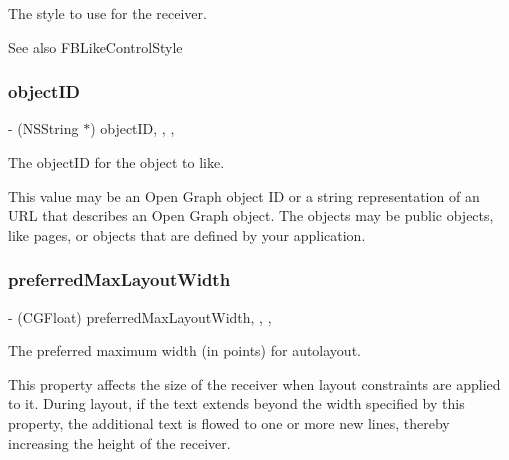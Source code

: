 The style to use for the receiver.

\begin{DoxySeeAlso}{See also}
F\+B\+Like\+Control\+Style 
\end{DoxySeeAlso}
\mbox{\label{interfaceFBLikeControl_ad46d4cb5a5d5985e89a09193a8499ffd}} 
\subsubsection{\texorpdfstring{object\+ID}{objectID}}
{\footnotesize\ttfamily -\/ (N\+S\+String $\ast$) object\+ID\hspace{0.3cm}{\ttfamily [read]}, {\ttfamily [write]}, {\ttfamily [nonatomic]}, {\ttfamily [copy]}}

The object\+ID for the object to like.

This value may be an Open Graph object ID or a string representation of an U\+RL that describes an Open Graph object. The objects may be public objects, like pages, or objects that are defined by your application. \mbox{\label{interfaceFBLikeControl_a34871f0ad32d03df9f3659962a01c8c1}} 
\subsubsection{\texorpdfstring{preferred\+Max\+Layout\+Width}{preferredMaxLayoutWidth}}
{\footnotesize\ttfamily -\/ (C\+G\+Float) preferred\+Max\+Layout\+Width\hspace{0.3cm}{\ttfamily [read]}, {\ttfamily [write]}, {\ttfamily [nonatomic]}, {\ttfamily [assign]}}

The preferred maximum width (in points) for autolayout.

This property affects the size of the receiver when layout constraints are applied to it. During layout, if the text extends beyond the width specified by this property, the additional text is flowed to one or more new lines, thereby increasing the height of the receiver. \mbox{\label{interfaceFBLikeControl_aedeec4cc63d942105aeae5ce24bd877d}} 
